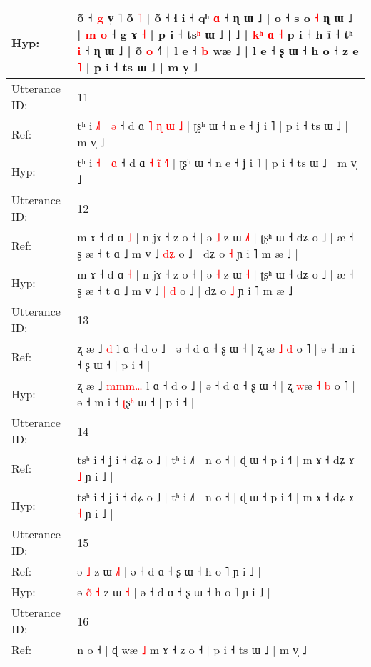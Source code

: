 \documentclass[10pt]{article}
\DeclareRobustCommand{\hl}[1]{{\textcolor{red}{#1}}}
\begin{document}
\begin{longtable}{ll}
 \\
Hyp: & õ ˧ \hl{g} v̩ ˥ õ \hl{˥} | õ ˧ ɬ i ˧ qʰ \hl{}\hl{ɑ} ˧ ɳ ɯ ˩ | o\hl{} ˧ s o \hl{˧} ɳ ɯ ˩ | \hl{m}\hl{ }\hl{o} ˧ g ɤ \hl{˧} | p i ˧ ts\hl{ʰ} ɯ ˩ |\hl{}\hl{}\hl{}\hl{}\hl{} ˩\hl{}\hl{}\hl{}\hl{}\hl{}\hl{} |\hl{}\hl{}\hl{}\hl{}\hl{}\hl{}\hl{}\hl{}\hl{}\hl{}\hl{}\hl{} \hl{}\hl{k}\hl{ʰ} \hl{ɑ} \hl{}\hl{˧} p i ˧ h ĩ ˧ tʰ \hl{}\hl{i} ˧ ɳ ɯ ˩ | õ\hl{ }\hl{o} ˧˥ | l e ˧ \hl{b} wæ ˩ | l e ˧ ʂ ɯ ˧ h o ˧ z e \hl{˥} | p i ˧ ts ɯ ˩ | m v̩ ˩
 \\
\midrule
Utterance ID: & 11 \\
Ref: & tʰ i \hl{˩}\hl{˥} | \hl{ə} ˧ d ɑ \hl{˥} \hl{ɳ}\hl{ }\hl{ɯ}\hl{ }\hl{˩} | ʈʂʰ ɯ ˧ n e ˧ ʝ i ˥ | p i ˧ ts ɯ ˩ | m v̩ ˩
 \\
Hyp: & tʰ i \hl{}\hl{˧} | \hl{ɑ} ˧ d ɑ \hl{˧} \hl{i}\hl{̃}\hl{ }\hl{˧}\hl{˥} | ʈʂʰ ɯ ˧ n e ˧ ʝ i ˥ | p i ˧ ts ɯ ˩ | m v̩ ˩
 \\
\midrule
Utterance ID: & 12 \\
Ref: & m ɤ ˧ d ɑ \hl{˩} | n jɤ ˧ z o ˧ | ə \hl{˩} z ɯ \hl{˩}\hl{˥} | ʈʂʰ ɯ ˧ dʑ o ˩ | æ ˧ ʂ æ ˧ t ɑ ˩ m v̩ ˩ \hl{}\hl{d}\hl{ʑ} o ˩ | dʑ o \hl{˧} ɲ i ˥ m æ ˩ |
 \\
Hyp: & m ɤ ˧ d ɑ \hl{˧} | n jɤ ˧ z o ˧ | ə \hl{˧} z ɯ \hl{}\hl{˧} | ʈʂʰ ɯ ˧ dʑ o ˩ | æ ˧ ʂ æ ˧ t ɑ ˩ m v̩ ˩ \hl{|}\hl{ }\hl{d} o ˩ | dʑ o \hl{˩} ɲ i ˥ m æ ˩ |
 \\
\midrule
Utterance ID: & 13 \\
Ref: & ʐ æ ˩ \hl{}\hl{}\hl{}\hl{d} l ɑ ˧ d o ˩ | ə ˧ d ɑ ˧ ʂ ɯ ˧ | ʐ \hl{}æ \hl{˩} \hl{d} o ˥ | ə ˧ m i ˧ \hl{}ʂ\hl{} ɯ ˧ | p i ˧ |
 \\
Hyp: & ʐ æ ˩ \hl{m}\hl{m}\hl{m}\hl{…} l ɑ ˧ d o ˩ | ə ˧ d ɑ ˧ ʂ ɯ ˧ | ʐ \hl{w}æ \hl{˧} \hl{b} o ˥ | ə ˧ m i ˧ \hl{ʈ}ʂ\hl{ʰ} ɯ ˧ | p i ˧ |
 \\
\midrule
Utterance ID: & 14 \\
Ref: & tsʰ i ˧ ʝ i ˧ dʑ o ˩ | tʰ i ˩˥ | n o ˧ | ɖ ɯ ˧ p i ˧˥ | m ɤ ˧ dʑ ɤ \hl{˩} ɲ i ˩ |
 \\
Hyp: & tsʰ i ˧ ʝ i ˧ dʑ o ˩ | tʰ i ˩˥ | n o ˧ | ɖ ɯ ˧ p i ˧˥ | m ɤ ˧ dʑ ɤ \hl{˧} ɲ i ˩ |
 \\
\midrule
Utterance ID: & 15 \\
Ref: & ə\hl{}\hl{}\hl{} \hl{˩} z ɯ \hl{˩}\hl{˥} | ə ˧ d ɑ ˧ ʂ ɯ ˧ h o ˥ ɲ i ˩ |
 \\
Hyp: & ə\hl{ }\hl{o}\hl{̃} \hl{˧} z ɯ \hl{}\hl{˧} | ə ˧ d ɑ ˧ ʂ ɯ ˧ h o ˥ ɲ i ˩ |
 \\
\midrule
Utterance ID: & 16 \\
Ref: & n o ˧ | ɖ wæ \hl{˩} m ɤ ˧ z o ˧ | p i ˧ ts ɯ ˩ | m v̩ ˩

\end{longtable}
\end{document}
